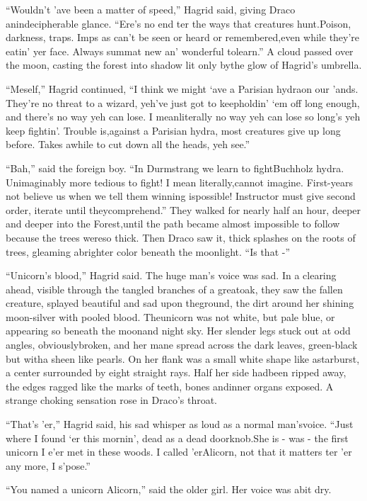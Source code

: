 ``Wouldn't 'ave been a matter of speed,'' Hagrid said, giving Draco anindecipherable glance. ``Ere's no end ter the ways that creatures hunt.Poison, darkness, traps. Imps as can't be seen or heard or remembered,even while they're eatin' yer face. Always summat new an' wonderful tolearn.''
A cloud passed over the moon, casting the forest into shadow lit only bythe glow of Hagrid's umbrella.

``Meself,'' Hagrid continued, ``I think we might `ave a Parisian hydraon our 'ands. They're no threat to a wizard, yeh've just got to keepholdin' `em off long enough, and there's no way yeh can lose. I meanliterally no way yeh can lose so long's yeh keep fightin'. Trouble is,against a Parisian hydra, most creatures give up long before. Takes awhile to cut down all the heads, yeh see.''

``Bah,'' said the foreign boy. ``In Durmstrang we learn to fightBuchholz hydra. Unimaginably more tedious to fight! I mean literally,cannot imagine. First-years not believe us when we tell them winning ispossible! Instructor must give second order, iterate until theycomprehend.''
They walked for nearly half an hour, deeper and deeper into the Forest,until the path became almost impossible to follow because the trees wereso thick.
Then Draco saw it, thick splashes on the roots of trees, gleaming abrighter color beneath the moonlight. ``Is that -''

``Unicorn's blood,'' Hagrid said. The huge man's voice was sad.
In a clearing ahead, visible through the tangled branches of a greatoak, they saw the fallen creature, splayed beautiful and sad upon theground, the dirt around her shining moon-silver with pooled blood. Theunicorn was not white, but pale blue, or appearing so beneath the moonand night sky. Her slender legs stuck out at odd angles, obviouslybroken, and her mane spread across the dark leaves, green-black but witha sheen like pearls. On her flank was a small white shape like astarburst, a center surrounded by eight straight rays. Half her side hadbeen ripped away, the edges ragged like the marks of teeth, bones andinner organs exposed.
A strange choking sensation rose in Draco's throat.

``That's 'er,'' Hagrid said, his sad whisper as loud as a normal man'svoice. ``Just where I found `er this mornin', dead as a dead doorknob.She is - was - the first unicorn I e'er met in these woods. I called 'erAlicorn, not that it matters ter 'er any more, I s'pose.''

``You named a unicorn Alicorn,'' said the older girl. Her voice was abit dry.

